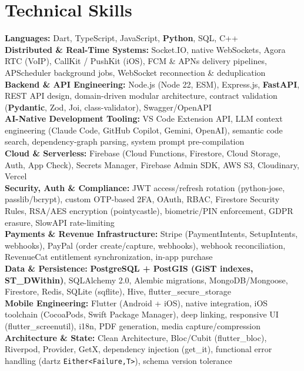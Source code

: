 \documentclass[10pt,letterpaper]{article}
\begin{document}
\section{Technical Skills}
\noindent
\textbf{Languages:} Dart, TypeScript, JavaScript, \textbf{Python}, SQL, C++ \\[2pt]
\textbf{Distributed \& Real-Time Systems:} Socket.IO, native WebSockets, Agora RTC (VoIP), CallKit / PushKit (iOS), FCM \& APNs delivery pipelines, APScheduler background jobs, WebSocket reconnection \& deduplication \\[2pt]
\textbf{Backend \& API Engineering:} Node.js (Node 22, ESM), Express.js, \textbf{FastAPI}, REST API design, domain-driven modular architecture, contract validation (\textbf{Pydantic}, Zod, Joi, class-validator), Swagger/OpenAPI \\[2pt]
\textbf{AI-Native Development Tooling:} VS Code Extension API, LLM context engineering (Claude Code, GitHub Copilot, Gemini, OpenAI), semantic code search, dependency-graph parsing, system prompt pre-compilation \\[2pt]
\textbf{Cloud \& Serverless:} Firebase (Cloud Functions, Firestore, Cloud Storage, Auth, App Check), Secrets Manager, Firebase Admin SDK, AWS S3, Cloudinary, Vercel \\[2pt]
\textbf{Security, Auth \& Compliance:} JWT access/refresh rotation (python-jose, passlib/bcrypt), custom OTP-based 2FA, OAuth, RBAC, Firestore Security Rules, RSA/AES encryption (pointycastle), biometric/PIN enforcement, GDPR erasure, SlowAPI rate-limiting \\[2pt]
\textbf{Payments \& Revenue Infrastructure:} Stripe (PaymentIntents, SetupIntents, webhooks), PayPal (order create/capture, webhooks), webhook reconciliation, RevenueCat entitlement synchronization, in-app purchase \\[2pt]
\textbf{Data \& Persistence:} \textbf{PostgreSQL + PostGIS (GiST indexes, ST\_DWithin)}, SQLAlchemy 2.0, Alembic migrations, MongoDB/Mongoose, Firestore, Redis, SQLite (sqflite), Hive, flutter\_secure\_storage \\[2pt]
\textbf{Mobile Engineering:} Flutter (Android + iOS), native integration, iOS toolchain (CocoaPods, Swift Package Manager), deep linking, responsive UI (flutter\_screenutil), i18n, PDF generation, media capture/compression \\[2pt]
\textbf{Architecture \& State:} Clean Architecture, Bloc/Cubit (flutter\_bloc), Riverpod, Provider, GetX, dependency injection (get\_it), functional error handling (dartz \texttt{Either<Failure,T>}), schema version tolerance \\[2pt]
\end{document}
